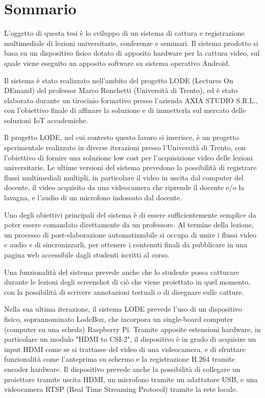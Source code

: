 \chapter*{Sommario} %
\label{sommario}


L'oggetto di questa tesi è lo sviluppo di un sistema di cattura e registrazione multimediale di lezioni universitarie, conferenze e seminari. Il sistema prodotto si basa su un dispositivo fisico dotato di apposito hardware per la cattura video, sul quale viene eseguito un apposito software su sistema operativo Android.

Il sistema è stato realizzato nell'ambito del progetto LODE (Lectures On DEmand) del professor Marco Ronchetti (Università di Trento), ed è stato elaborato durante un tirocinio formativo presso l'azienda AXIA STUDIO S.R.L., con l'obiettivo finale di affinare la soluzione e di immetterla sul mercato delle soluzioni IoT accademiche.

Il progetto LODE, nel cui contesto questo lavoro si inserisce, è un progetto sperimentale realizzato in diverse iterazioni presso l'Università di Trento, con l'obiettivo di fornire una soluzione low cost per l'acquisizione video delle lezioni universitarie. Le ultime versioni del sistema prevedono la possibilità di registrare flussi multimediali multipli, in particolare il video in uscita dal computer del docente, il video acquisito da una videocamera che riprende il docente e/o la lavagna, e l'audio di un microfono indossato dal docente.

Uno degli obiettivi principali del sistema è di essere sufficientemente semplice da poter essere comandato direttamente da un professore. Al termine della lezione, un processo di post-elaborazione automatizzabile si occupa di unire i flussi video e audio e di sincronizzarli, per ottenere i contenuti finali da pubblicare in una pagina web accessibile dagli studenti iscritti al corso.

Una funzionalità del sistema prevede anche che lo studente possa catturare durante le lezioni degli screenshot di ciò che viene proiettato in quel momento, con la possibilità di scrivere annotazioni testuali o di disegnare sulle catture.

Nella sua ultima iterazione, il sistema LODE prevede l'uso di un dispositivo fisico, soprannominato LodeBox, che incorpora un single-board computer (computer su una scheda) Raspberry Pi. Tramite apposite estensioni hardware, in particolare un modulo "HDMI to CSI-2", il dispositivo è in grado di acquisire un input HDMI come se si trattasse del video di una videocamera, e di sfruttare funzionalità come l'anteprima su schermo e la registrazione H.264 tramite encoder hardware. Il dispositivo prevede anche la possibilità di collegare un proiettore tramite uscita HDMI, un microfono tramite un adattatore USB, e una videocamera RTSP (Real Time Streaming Protocol) tramite la rete locale.

